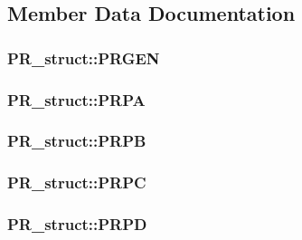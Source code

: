 \subsection{Member Data Documentation}
\hypertarget{struct_p_r__struct_ab94c5e750b8aa6fb1073a6fe3dcb4e8c}{
\subsubsection[{PRGEN}]{ {\bf PR\_\-struct::PRGEN}}}
\label{struct_p_r__struct_ab94c5e750b8aa6fb1073a6fe3dcb4e8c}
\hypertarget{struct_p_r__struct_a085b84a3b5230193604c1b677ba8f5e3}{
\subsubsection[{PRPA}]{ {\bf PR\_\-struct::PRPA}}}
\label{struct_p_r__struct_a085b84a3b5230193604c1b677ba8f5e3}
\hypertarget{struct_p_r__struct_a9e91484649b2a79c64d7eecd0e8878f3}{
\subsubsection[{PRPB}]{ {\bf PR\_\-struct::PRPB}}}
\label{struct_p_r__struct_a9e91484649b2a79c64d7eecd0e8878f3}
\hypertarget{struct_p_r__struct_a795e9fe0b56aca1fa377bc83bb0b9e9c}{
\subsubsection[{PRPC}]{ {\bf PR\_\-struct::PRPC}}}
\label{struct_p_r__struct_a795e9fe0b56aca1fa377bc83bb0b9e9c}
\hypertarget{struct_p_r__struct_a16393fdf8b1b9c7b92e6b65ac0b2689f}{
\subsubsection[{PRPD}]{ {\bf PR\_\-struct::PRPD}}}
\label{struct_p_r__struct_a16393fdf8b1b9c7b92e6b65ac0b2689f}
